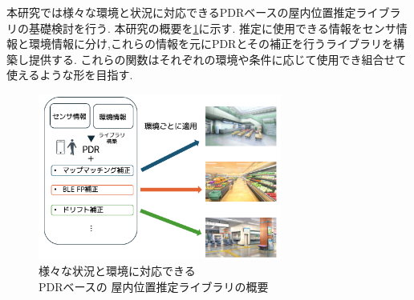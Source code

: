 本研究では様々な環境と状況に対応できるPDRベースの屋内位置推定ライブラリの基礎検討を行う.
本研究の概要を\ref{fig:overview}に示す.
推定に使用できる情報をセンサ情報と環境情報に分け,これらの情報を元にPDRとその補正を行うライブラリを構築し提供する.
これらの関数はそれぞれの環境や条件に応じて使用でき組合せて使えるような形を目指す.

\begin{figure}[h]
	\centering
	\includegraphics[width=80mm]{image/first.png}
	\caption{様々な状況と環境に対応できる\\PDRベースの
		屋内位置推定ライブラリの概要}    \label{fig:overview}
\end{figure}
